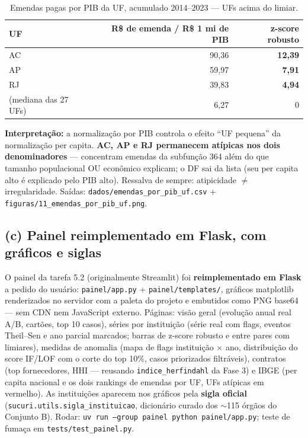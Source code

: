 \documentclass[11pt,a4paper]{article}
\begin{document}
\begin{table}[h]
\centering
\begin{tabular}{lrr}
\toprule
UF & R\$ de emenda / R\$ 1 mi de PIB & z-score robusto \\
\midrule
AC & 90,36 & \textbf{12,39} \\
AP & 59,97 & \textbf{7,91} \\
RJ & 39,83 & \textbf{4,94} \\
(mediana das 27 UFs) & 6,27 & 0 \\
\bottomrule
\end{tabular}
\caption{Emendas pagas por PIB da UF, acumulado 2014--2023 --- UFs acima do limiar.}
\end{table}

\textbf{Interpretação:} a normalização por PIB controla o efeito ``UF
pequena'' da normalização per capita. \textbf{AC, AP e RJ permanecem
atípicas nos dois denominadores} --- concentram emendas da subfunção 364
além do que tamanho populacional OU econômico explicam; o DF sai da
lista (seu per capita alto é explicado pelo PIB alto). Ressalva de
sempre: atipicidade $\neq$ irregularidade. Saídas:
\texttt{dados/emendas\_por\_pib\_uf.csv} +
\texttt{figuras/11\_emendas\_por\_pib\_uf.png}.

\subsection*{(c) Painel reimplementado em Flask, com gráficos e siglas}

O painel da tarefa 5.2 (originalmente Streamlit) foi
\textbf{reimplementado em Flask} a pedido do usuário:
\texttt{painel/app.py} + \texttt{painel/templates/}, gráficos matplotlib
renderizados no servidor com a paleta do projeto e embutidos como PNG
base64 --- sem CDN nem JavaScript externo. Páginas: visão geral (evolução
anual real A/B, cartões, top 10 casos), séries por instituição (série
real com flags, eventos Theil--Sen e ano parcial marcados; barras de
z-score robusto e entre pares com limiares), medidas de anomalia (mapa de
flags instituição $\times$ ano, distribuição do score IF/LOF com o corte
do top 10\%, casos priorizados filtráveis), contratos (top fornecedores,
HHI --- reusando \texttt{indice\_herfindahl} da Fase 3) e IBGE (per
capita nacional e os dois rankings de emendas por UF, UFs atípicas em
vermelho). As instituições aparecem nos gráficos pela \textbf{sigla
oficial} (\texttt{sucuri.utils.sigla\_instituicao}, dicionário curado dos
${\sim}$115 órgãos do Conjunto B). Rodar:
\texttt{uv run --group painel python painel/app.py}; teste de fumaça em
\texttt{tests/test\_painel.py}.
\end{document}
